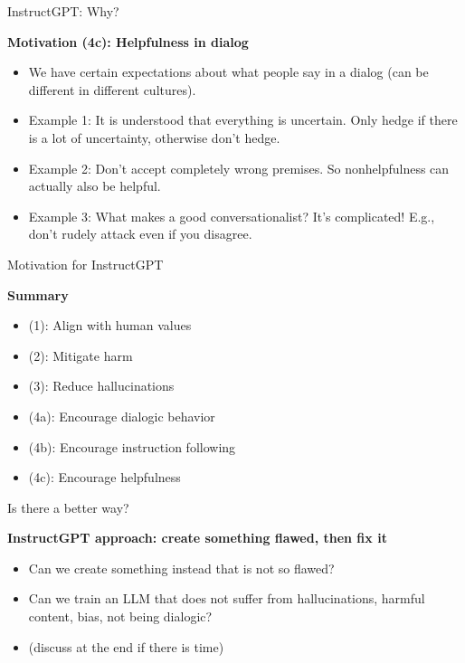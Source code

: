 \begin{vbframe}{InstructGPT: Why?}

\vfill

\textbf{Motivation (4c): Helpfulness in dialog}

	\begin{itemize}
		\item We have certain expectations about
		what people say in a dialog (can be
		different in different cultures). 
		\item Example 1: It is understood that
		everything is uncertain. Only hedge if there
		is a lot of uncertainty, otherwise don't hedge.
                \item Example 2: Don't
		accept completely wrong premises. So
		nonhelpfulness can actually also be helpful.
		\item Example 3: What makes a good
		conversationalist? It's complicated! E.g.,
                don't rudely attack even
		if you disagree.
	\end{itemize}

\vfill

\end{vbframe}

\begin{vbframe}{Motivation for InstructGPT}

\vfill

\textbf{Summary}

	\begin{itemize}
\item (1): Align with human values
\item (2): Mitigate harm
\item (3): Reduce hallucinations
\item (4a): Encourage dialogic behavior
\item (4b): Encourage instruction following
\item (4c): Encourage helpfulness
	\end{itemize}

\vfill

\end{vbframe}


\begin{vbframe}{Is there a better way?}

\vfill

\textbf{InstructGPT approach: create something flawed, then fix it}

	\begin{itemize}
		\item Can we create something instead that
		is not so flawed?
                \item Can we train an LLM that does not
		suffer from hallucinations, harmful content,
		bias, not being dialogic?
\item (discuss at the end if there is time)
	\end{itemize}

\vfill

\end{vbframe}



